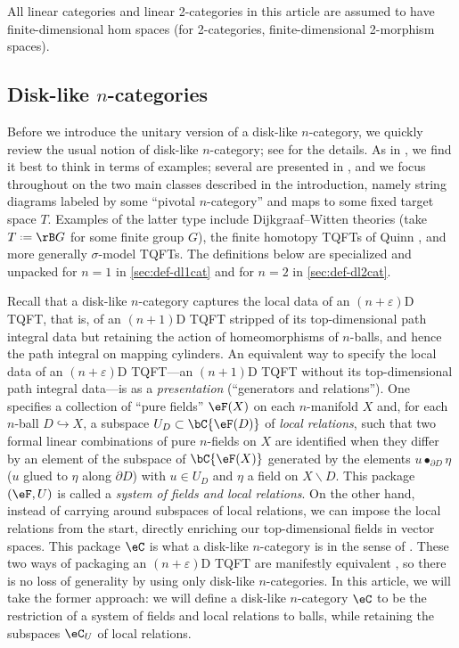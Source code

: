\documentclass[12pt,reqno]{amsart}
\newcommand{\C}{\eC}
\newcommand{\e}{\varepsilon}
\newcommand{\blt}{\bullet}
\newcommand{\defn}[1]{\emph{#1}}
\renewcommand{\setminus}{\smallsetminus}
\DeclareRobustCommand{\coloneq}{\mathrel{\vcenter{\baselineskip0.5ex\lineskiplimit0pt\hbox{\scriptsize{\upshape.}}\hbox{\scriptsize{\upshape.}}}}=}
\newcommand{\lU}[1]{#1_U}
\begin{document}
\begin{convention}
\label{sec:fd-convention}
All linear categories and linear 2-categories in this article are assumed to have finite-dimensional hom spaces (for 2-categories, finite-dimensional 2-morphism spaces).
\end{convention}

\subsection{Disk-like \texorpdfstring{$n$}{n}-categories}
\label{sec:dlncats}
Before we introduce the unitary version of a disk-like $n$-category, we quickly review the usual notion of disk-like $n$-category; see \cite[\S6.1]{MW12} for the details. As in \cite{MW12}, we find it best to think in terms of examples; several are presented in \cite[\S6.2]{MW12}, and we focus throughout on the two main classes described in the introduction, namely string diagrams labeled by some ``pivotal $n$-category'' \cite{W06,W14premodular,DR18} and maps to some fixed target space $T$. Examples of the latter type include Dijkgraaf--Witten theories \cite{DW90} (take $T\coloneq \rB G$ for some finite group $G$), the finite homotopy TQFTs of Quinn \cite[Lec. 4]{Q95}, and more generally $\sigma$-model TQFTs. The definitions below are specialized and unpacked for $n=1$ in \cref{sec:def-dl1cat} and for $n=2$ in \cref{sec:def-dl2cat}.


Recall that a disk-like $n$-category captures the local data of an $(n+\e)$D TQFT, that is, of an $(n+1)$D TQFT stripped of its top-dimensional path integral data but retaining the action of homeomorphisms of $n$-balls, and hence the path integral on mapping cylinders. An equivalent way to specify the local data of an $(n+\e)$D TQFT---an $(n+1)$D TQFT without its top-dimensional path integral data---is as a \emph{presentation} (``generators and relations''). One specifies a collection of ``pure fields'' $\eF(X)$ on each $n$-manifold $X$ and, for each $n$-ball $D\hookrightarrow X$, a subspace $U_D\subset\bC\{\eF(D)\}$ of \defn{local relations}, such that two formal linear combinations of pure $n$-fields on $X$ are identified when they differ by an element of the subspace of $\bC\{\eF(X)\}$ generated by the elements $u\blt_{\partial D}\eta$ ($u$ glued to $\eta$ along $\partial D$) with $u\in U_D$ and $\eta$ a field on $X\setminus D$.
This package $(\eF,U)$ is called a \defn{system of fields and local relations}.
On the other hand, instead of carrying around subspaces of local relations, we can impose the local relations from the start, directly enriching our top-dimensional fields in vector spaces.
This package $\C$ is what a disk-like $n$-category is in the sense of \cite{MW12}. These two ways of packaging an $(n+\e)$D TQFT are manifestly equivalent \cite[\S6.1]{MW12}, so there is no loss of generality by using only disk-like $n$-categories. In this article, we will take the former approach: we will define a disk-like $n$-category $\C$ to be the restriction of a system of fields and local relations to balls, while retaining the subspaces $\lU{\C}$ of local relations.
\end{document}
